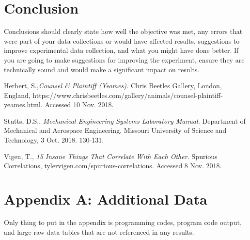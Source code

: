 \documentclass[11pt,a4paper]{article}
\begin{document}
\section*{Conclusion}
Conclusions should clearly state how well the objective was met, any errors that were part of your data collections or would have affected results, suggestions to improve experimental data collection, and what you might have done better. If you are going to make suggestions for improving the experiment, ensure they are technically sound and would make a significant impact on results.

\begin{thebibliography}{3} %

  Herbert, S.,\emph{Counsel \& Plaintiff (Yeames).}
  Chris Beetles Gallery, London, England, https://www.chrisbeetles.com/gallery/animals/counsel-plaintiff-yeames.html. Accessed 10 Nov. 2018.
  
  Stutts, D.S., \emph{Mechanical Engineering Systems Laboratory Manual.}
  Department of Mechanical and Aerospace Engineering, Missouri University of Science and Technology, 3 Oct. 2018. 130-131.
  
  Vigen, T., \emph{15 Insane Things That Correlate With Each Other.}
  Spurious Correlations, tylervigen.com/spurious-correlations. Accessed 8 Nov. 2018.

\end{thebibliography}

\newpage %
\section*{Appendix A: Additional Data}
Only thing to put in the appendix is programming codes, program code output, and large raw data tables that are not referenced in any results.
\end{document}
